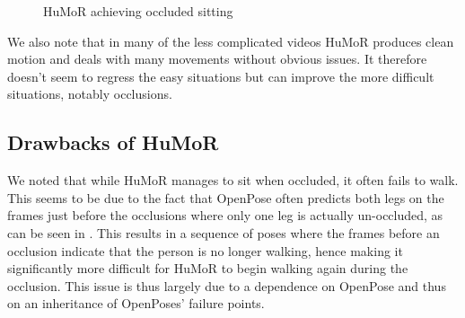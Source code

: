 \begin{figure}[!ht]
    \centering
    \hfil
    \hfil
    \caption{HuMoR achieving occluded sitting}
    \label{fig:humor_sitting}
\end{figure}

We also note that in many of the less complicated videos HuMoR produces clean motion and deals with many movements without obvious issues. It therefore doesn't seem to regress the easy situations but can improve the more difficult situations, notably occlusions.


\subsection{Drawbacks of HuMoR}

We noted that while HuMoR manages to sit when occluded, it often fails to walk. This seems to be due to the fact that OpenPose often predicts both legs on the frames just before the occlusions where only one leg is actually un-occluded, as can be seen in . This results in a sequence of poses where the frames before an occlusion indicate that the person is no longer walking, hence making it significantly more difficult for HuMoR to begin walking again during the occlusion. This issue is thus largely due to a dependence on OpenPose and thus on an inheritance of OpenPoses' failure points.

